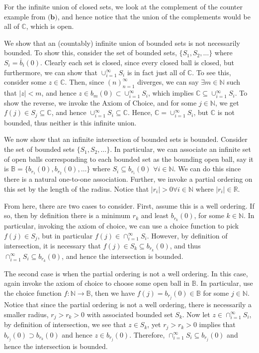 \documentclass[10pt]{article}
\newcommand{\R}{\mathbb{R}}
\newcommand{\C}{\mathbb{C}}
\newcommand{\N}{\mathbb{N}}
\begin{document}
For the infinite union of closed sets, we look at the complement of the counter example from $\textbf{(b)}$, and hence notice that the union of the complements would be all of $\C$, which is open.

We show that an (countably) infinite union of bounded sets is not necessarily bounded. To show this, consider the set of bounded sets, $\{S_{1}, S_{2}, \dots\}$ where $S_{i} = \bar{b}_{i}(0)$. Clearly each set is closed, since every closed ball is closed, but furthermore, we can show that $\cup_{i=1}^{\infty}S_{i}$ is in fact just all of $\C$. To see this, consider some $z\in\C$. Then, since $(n)_{n=1}^{\infty}$ diverges, we can say $\exists m\in \N$ such that $|z| < m$, and hence $z \in b_{m}(0) \subset \cup_{i=1}^{\infty}S_{i}$, which implies $\C \subseteq\cup_{i=1}^{\infty}S_{i}$. To show the reverse, we invoke the Axiom of Choice, and for some $j\in\N$, we get $f(j)\in S_{j} \subseteq \C$, and hence $ \cup_{i=1}^{\infty}S_{i} \subseteq \C$. Hence, $\C = \cup_{i=1}^{\infty}S_{i}$, but $\C$ is not bounded, thus neither is this infinite union.

We now show that an infinite intersection of bounded sets is bounded. Consider the set of bounded sets $\{S_{1},S_{2}, \dots \}$. In particular, we can associate an infinite set of open balls corresponding to each bounded set as the bounding open ball, say it is $\mathbb{B} =\{b_{r_{1}}(0),b_{r_{2}}(0), \dots \}$ where $S_{i} \subseteq b_{r_{i}}(0)$ $\forall i\in\N$. We can do this since there is a natural one-to-one association. Further, we invoke a partial ordering on this set by the length of the radius. Notice that $|r_{i}| > 0 \forall i\in\N$ where $|r_{i}| \in \R$.

From here, there are two cases to consider. First, assume this is a well ordering. If so, then by definition there is a minimum $r_{k}$ and least $b_{r_{k}}(0)$, for some $k\in\N$. In particular, invoking the axiom of choice, we can use a choice function to pick $f(j) \in S_{j}$, but in particular $f(j) \in \cap_{i=1}^{\infty}S_{i}$. However, by definition of intersection, it is necessary that $f(j)\in S_{k} \subseteq b_{r_{k}}(0)$, and thus $\cap_{i=1}^{\infty}S_{i}\subseteq b_{r_{k}}(0)$, and hence the intersection is bounded.

The second case is when the partial ordering is not a well ordering. In this case, again invoke the axiom of choice to choose some open ball in $\mathbb{B}$. In particular, use the choice function $f:\N \to \mathbb{B}$, then we have $f(j) = b_{r_{j}}(0)\in \mathbb{B}$ for some $j\in \N$. Notice that since the partial ordering is not a well ordering, there is necessarily a smaller radius,  $r_{j} > r_{k} > 0$ with associated bounded set $S_{k}$. Now let $z\in \cap_{i=1}^{\infty}S_{i}$, by definition of intersection, we see that $z \in S_{k}$, yet $r_{j}>r_{k}>0$ implies that $b_{r_{j}}(0) \supset b_{r_{k}}(0)$ and hence $z \in b_{r_{j}}(0)$. Therefore, $\cap_{i=1}^{\infty}S_{i} \subseteq b_{r_{j}}(0)$ and hence the intersection is bounded.
\end{document}
